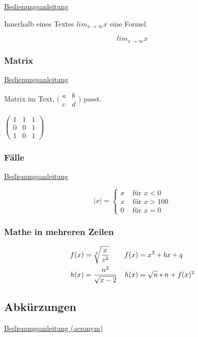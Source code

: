 \href{https://de.overleaf.com/learn/latex/Integrals%2C_sums_and_limits}{Bedienungsanleitung}

Innerhalb eines Textes $lim_{x\to \infty} x$ eine Formel.

\[lim_{x\to \infty} x\]

\subsubsection{Matrix}

\href{https://www.overleaf.com/learn/latex/Matrices}{Bedienungsanleitung}

Matrix im Text,
  $\big(\begin{smallmatrix}
  a & b\\
  c & d
\end{smallmatrix}\big)$
passt.

$\begin{pmatrix}
  1 & 1 & 1\\
  0 & 0 & 1\\
  1 & 0 & 1
\end{pmatrix}$

\subsubsection{Fälle}

\href{https://www.overleaf.com/latex/examples/cases/nndqpbymnchn}{Bedienungsanleitung}

\[
|x|=
\begin{cases}
x & \text{ für } x < 0\\
x & \text{ für } x > 100\\
0 & \text{ für } x = 0
\end{cases}
\]

\subsubsection{Mathe in mehreren Zeilen}

\begin{align}
  f(x)&=\sqrt[3]{\frac{x}{z^2}} &f(x)&=x^2+bx+q\\
  h(x)&=\frac{n^2}{\sqrt{x-2}} &h(x)&=\sqrt{n}\ast n+f(x)^2\notag
\end{align}

\subsection{Abkürzungen}

\href{https://www.namsu.de/Extra/pakete/Acronym.html}{Bedienungsanleitung (acronym)}

